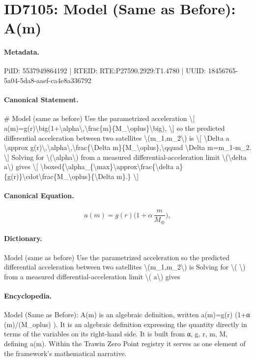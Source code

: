 \section*{ID7105: Model (Same as Before): A(m)}
\paragraph{Metadata.}
PiID: 5537949864192 | RTEID: RTE:P27590.2929:T1.4780 | UUID: 18456765-5a04-5da8-aaef-ca4e8a336792

\paragraph{Canonical Statement.}
\# Model (same as before) Use the parametrized acceleration \textbackslash{}[ a(m)=g(r)\textbackslash{}big(1+\textbackslash{}alpha\textbackslash{},\textbackslash{}frac\{m\}\{M\_\textbackslash{}oplus\}\textbackslash{}big), \textbackslash{}] so the predicted differential acceleration between two satellites \textbackslash{}(m\_1,m\_2\textbackslash{}) is \textbackslash{}[ \textbackslash{}Delta a \textbackslash{}approx g(r)\textbackslash{},\textbackslash{}alpha\textbackslash{},\textbackslash{}frac\{\textbackslash{}Delta m\}\{M\_\textbackslash{}oplus\},\textbackslash{}qquad \textbackslash{}Delta m=m\_1-m\_2. \textbackslash{}] Solving for \textbackslash{}(\textbackslash{}alpha\textbackslash{}) from a measured differential-acceleration limit \textbackslash{}(\textbackslash{}delta a\textbackslash{}) gives \textbackslash{}[ \textbackslash{}boxed\{\textbackslash{}alpha\_\{\textbackslash{}max\}\textbackslash{}approx\textbackslash{}frac\{\textbackslash{}delta a\}\{g(r)\}\textbackslash{}cdot\textbackslash{}frac\{M\_\textbackslash{}oplus\}\{\textbackslash{}Delta m\}.\} \textbackslash{}]

\paragraph{Canonical Equation.}
\[
a(m)=g(r)\big(1+\alpha\,\frac{m}{M_\oplus}\big),
\]

\paragraph{Dictionary.}
Model (same as before) Use the parametrized acceleration so the predicted differential acceleration between two satellites \textbackslash{}(m\_1,m\_2\textbackslash{}) is Solving for \textbackslash{}( \textbackslash{}) from a measured differential-acceleration limit \textbackslash{}( a\textbackslash{}) gives

\paragraph{Encyclopedia.}
Model (Same as Before): A(m) is an algebraic definition, written a(m)=g(r) (1+α (m)/(M\_oplus) ). It is an algebraic definition expressing the quantity directly in terms of the variables on its right-hand side. It is built from α, g, r, m, M, defining a(m). Within the Trawin Zero Point registry it serves as one element of the framework's mathematical narrative.

